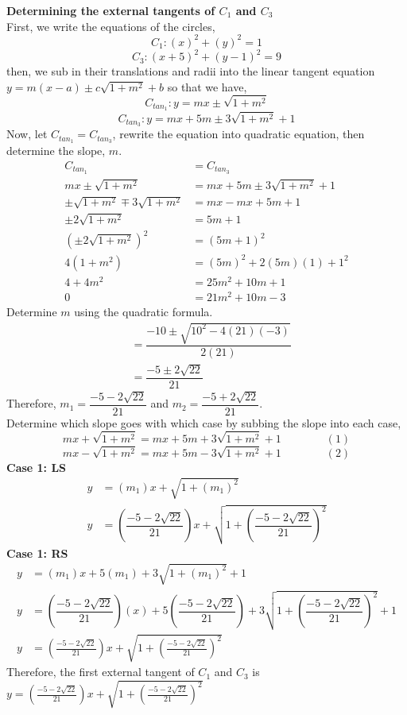 \documentclass[12pt]{book}
\begin{document}
\begin{enumerate}
\textbf{Determining the external tangents of $C_1$ and $C_3$}\\
First, we write the equations of the circles,
$$C_1: \left(x\right)^{2}+\left(y\right)^{2}=1$$
$$C_3: \left(x+5\right)^{2}+\left(y-1\right)^{2}=9$$
then, we sub in their translations and radii into the linear tangent equation $y = m(x-a) \pm c\sqrt{1+m^2} + b$ so that we have,
$$C_{tan_1}: y=mx \pm \sqrt{1+m^{2}}$$
$$C_{tan_3}: y=mx + 5m \pm 3\sqrt{1+m^{2}}+1$$
Now, let $C_{tan_1} = C_{tan_3}$, rewrite the equation into quadratic equation, then determine the slope, $m$.
\begin{align}
    C_{tan_1} &= C_{tan_3} \\
    mx \pm \sqrt{1+m^{2}} &= mx + 5m \pm 3\sqrt{1+m^{2}}+1 \\
    \pm \sqrt{1+m^{2}} \mp 3\sqrt{1+m^{2}} &= mx - mx + 5m + 1 \\
    \pm2\sqrt{1+m^{2}} &= 5m + 1 \\
    \left(\pm2\sqrt{1+m^{2}}\right)^2 &= (5m + 1)^2 \\
    4(1+m^2) &= (5m)^2 + 2(5m)(1) + 1^2 \\
    4+4m^2 &= 25m^2 + 10m + 1 \\
    0 &= 21m^2 + 10m - 3
\end{align}
Determine $m$ using the quadratic formula.
\begin{align}
    &= \dfrac{-10 \pm \sqrt{10^2 - 4(21)(-3)}}{2(21)} \\
    &= \dfrac{-5\pm2\sqrt{22}}{21}
\end{align}
Therefore, $m_1 = \dfrac{-5-2\sqrt{22}}{21}$ and $m_2 = \dfrac{-5+2\sqrt{22}}{21}$.\\

Determine which slope goes with which case by subbing the slope into each case,
$$mx + \sqrt{1+m^{2}} = mx + 5m + 3\sqrt{1+m^{2}}+1 \qquad \qquad (1)$$
$$mx - \sqrt{1+m^{2}} = mx + 5m - 3\sqrt{1+m^{2}}+1 \qquad \qquad (2)$$
\textbf{Case 1: LS}
\begin{align}
    y &= (m_1)x + \sqrt{1+(m_1)^{2}} \\
    y &= \left(\dfrac{-5-2\sqrt{22}}{21}\right)x + \sqrt{1+ \left(\dfrac{-5-2\sqrt{22}}{21}\right)^2}
\end{align}
\textbf{Case 1: RS}
\begin{align}
    y &= (m_1)x + 5(m_1) + 3\sqrt{1+(m_1)^{2}}+1 \\
    y &=  \left(\dfrac{-5-2\sqrt{22}}{21}\right)(x)+5\left(\dfrac{-5-2\sqrt{22}}{21}\right)+3\sqrt{1+ \left(\dfrac{-5-2\sqrt{22}}{21}\right)^2}+1 \\
    y &= \left(\frac{-5-2\sqrt{22}}{21}\right)x+\sqrt{1+\left(\frac{-5-2\sqrt{22}}{21}\right)^{2}}
\end{align}
Therefore, the first external tangent of $C_1$ and $C_3$ is $y=\left(\frac{-5-2\sqrt{22}}{21}\right)x+\sqrt{1+\left(\frac{-5-2\sqrt{22}}{21}\right)^{2}}$


\end{enumerate}
\end{document}
